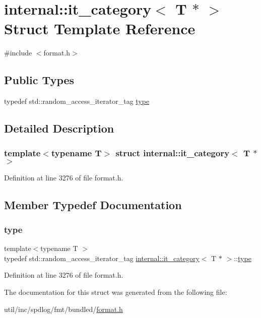\hypertarget{structinternal_1_1it__category_3_01_t_01_5_01_4}{}\section{internal\+:\+:it\+\_\+category$<$ T $\ast$ $>$ Struct Template Reference}
\label{structinternal_1_1it__category_3_01_t_01_5_01_4}


{\ttfamily \#include $<$format.\+h$>$}

\subsection*{Public Types}
\begin{DoxyCompactItemize}
\item 
typedef std\+::random\+\_\+access\+\_\+iterator\+\_\+tag \hyperlink{structinternal_1_1it__category_3_01_t_01_5_01_4_ac3569c41322fa47145b653442098c0f5}{type}
\end{DoxyCompactItemize}


\subsection{Detailed Description}
\subsubsection*{template$<$typename T$>$\newline
struct internal\+::it\+\_\+category$<$ T $\ast$ $>$}



Definition at line 3276 of file format.\+h.



\subsection{Member Typedef Documentation}
\mbox{\label{structinternal_1_1it__category_3_01_t_01_5_01_4_ac3569c41322fa47145b653442098c0f5}} 
\subsubsection{\texorpdfstring{type}{type}}
{\footnotesize\ttfamily template$<$typename T $>$ \\
typedef std\+::random\+\_\+access\+\_\+iterator\+\_\+tag \hyperlink{structinternal_1_1it__category}{internal\+::it\+\_\+category}$<$ T $\ast$ $>$\+::\hyperlink{structinternal_1_1it__category_3_01_t_01_5_01_4_ac3569c41322fa47145b653442098c0f5}{type}}



Definition at line 3276 of file format.\+h.



The documentation for this struct was generated from the following file\+:\begin{DoxyCompactItemize}
\item 
util/inc/spdlog/fmt/bundled/\hyperlink{format_8h}{format.\+h}\end{DoxyCompactItemize}

